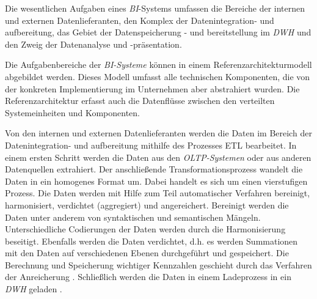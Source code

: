 Die wesentlichen Aufgaben eines \textit{\acrshort{BI}}-Systems umfassen die Bereiche der internen und externen Datenlieferanten, den Komplex der Datenintegration- und aufbereitung, 
das Gebiet der Datenspeicherung - und bereitstellung im \textit{\acrshort{DWH}} und den Zweig der Datenanalyse und -präsentation\cites[vgl.][126 ff.]{linden_geschaftsmodellbasierte_2016}[vgl.][8]{kemper_business_2010}. 

Die Aufgabenbereiche der \textit{\acrshort{BI}-Systeme} können in einem Referenzarchitekturmodell abgebildet werden. Dieses Modell umfasst alle technischen Komponenten, die von 
der konkreten Implementierung im Unternehmen aber abstrahiert wurden. Die Referenzarchitektur erfasst auch die Datenflüsse zwischen den verteilten Systemeinheiten und Komponenten\cite[vgl.][126 ff.]{linden_geschaftsmodellbasierte_2016}.



Von den internen und externen Datenlieferanten werden die Daten im Bereich der Datenintegration- und aufbereitung mithilfe des Prozesses \acrfull{ETL} bearbeitet. 
In einem ersten Schritt werden die Daten aus den \textit{\acrshort{OLTP}-Systemen} oder aus anderen Datenquellen extrahiert. 
Der anschließende Transformationsprozess wandelt die Daten in ein homogenes Format um. Dabei handelt es sich um einen vierstufigen Prozess. Die Daten werden mit Hilfe 
zum Teil automatischer Verfahren bereinigt, harmonisiert, verdichtet (aggregiert) und angereichert.
Bereinigt werden die Daten unter anderem von syntaktischen und semantischen Mängeln. Unterschiedliche Codierungen der Daten werden durch die Harmonisierung 
beseitigt. Ebenfalls werden die Daten verdichtet, d.h. es werden Summationen mit den Daten auf verschiedenen Ebenen durchgeführt und gespeichert. 
Die Berechnung und Speicherung wichtiger Kennzahlen geschieht durch das Verfahren der Anreicherung \cites[Vgl.][86]{gronwald_integrierte_2020}[vgl.][277 f.]{abts_grundkurs_2017}.
Schließlich werden die Daten in einem Ladeprozess in ein \textit{\acrshort{DWH}} geladen \cite[vgl.][129 ff.]{linden_geschaftsmodellbasierte_2016}. 

